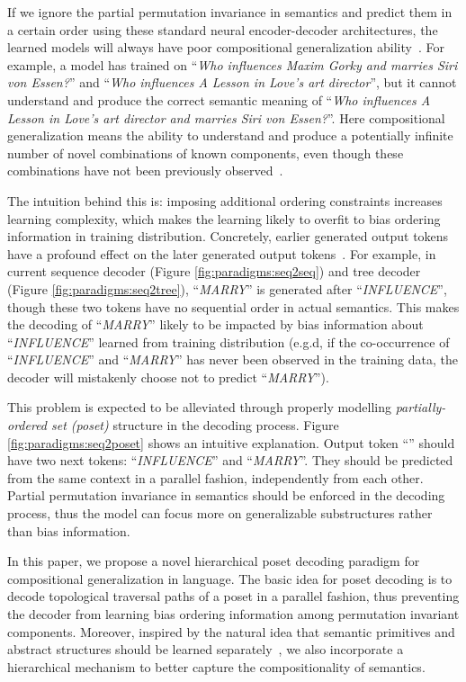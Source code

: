 \documentclass{article}
\begin{document}
If we ignore the partial permutation invariance in semantics and predict them in a certain order using these standard neural encoder-decoder architectures, the learned models will always have poor compositional generalization ability~\citep{keysers2020measuring}.
For example, a model has trained on ``\emph{Who influences Maxim Gorky and marries Siri von Essen?}'' and ``\emph{Who influences A Lesson in Love's art director}'', but it cannot understand and produce the correct semantic meaning of ``\emph{Who influences A Lesson in Love's art director and marries Siri von Essen?}''.
Here compositional generalization means the ability to understand and produce a potentially infinite number of novel combinations of known components, even though these combinations have not been previously observed~\citep{chomsky1965aspects}.

The intuition behind this is: imposing additional ordering constraints increases learning complexity, which makes the learning likely to overfit to bias ordering information in training distribution.
Concretely, earlier generated output tokens have a profound effect on the later generated output tokens~\citep{mehri2018middle,wu2018beyond}.
For example, in current sequence decoder (Figure \ref{fig:paradigms:seq2seq}) and tree decoder (Figure \ref{fig:paradigms:seq2tree}), ``\emph{MARRY}'' is generated after ``\emph{INFLUENCE}'', though these two tokens have no sequential order in actual semantics.
This makes the decoding of ``\emph{MARRY}'' likely to be impacted by bias information about ``\emph{INFLUENCE}'' learned from training distribution (e.g.d, if the co-occurrence of ``\emph{INFLUENCE}'' and ``\emph{MARRY}'' has never been observed in the training data, the decoder will mistakenly choose not to predict ``\emph{MARRY}'').

This problem is expected to be alleviated through properly modelling \emph{partially-ordered set (poset)} structure in the decoding process.
Figure \ref{fig:paradigms:seq2poset} shows an intuitive explanation.
Output token ``'' should have two next tokens: ``\emph{INFLUENCE}'' and ``\emph{MARRY}''.
They should be predicted from the same context in a parallel fashion, independently from each other.
Partial permutation invariance in semantics should be enforced in the decoding process, thus the model can focus more on generalizable substructures rather than bias information.


In this paper, we propose a novel hierarchical poset decoding paradigm for compositional generalization in language.
The basic idea for poset decoding is to decode topological traversal paths of a poset in a parallel fashion, thus preventing the decoder from learning bias ordering information among permutation invariant components. Moreover, inspired by the natural idea that semantic primitives and abstract structures should be learned separately~\citep{russin2019compositional, li2019compositional, lake2019compositional, gordon2020permutation}, we also incorporate a hierarchical mechanism to better capture the compositionality of semantics.
\end{document}
